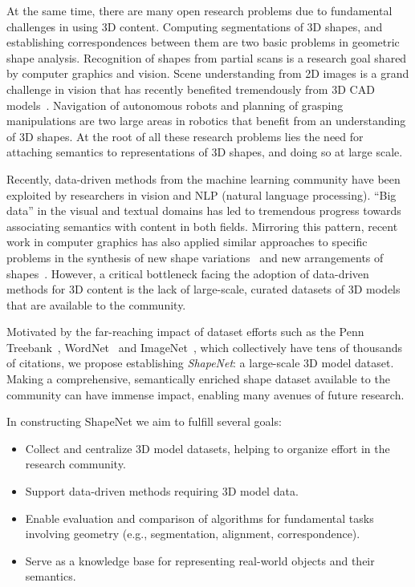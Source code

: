 At the same time, there are many open research problems due to fundamental challenges in using 3D content.  Computing segmentations of 3D shapes, and establishing correspondences between them are two basic problems in geometric shape analysis.  Recognition of shapes from partial scans is a research goal shared by computer graphics and vision.  Scene understanding from 2D images is a grand challenge in vision that has recently benefited tremendously from 3D CAD models~\cite{Song:2014:slidingwindow,wu:2014:3d}. Navigation of autonomous robots and planning of grasping manipulations are two large areas in robotics that benefit from an understanding of 3D shapes.  At the root of all these research problems lies the need for attaching semantics to representations of 3D shapes, and doing so at large scale.

Recently, data-driven methods from the machine learning community have been exploited by researchers in vision and NLP (natural language processing). ``Big data'' in the visual and textual domains has led to tremendous progress towards associating semantics with content in both fields.  Mirroring this pattern, recent work in computer graphics has also applied similar approaches to specific problems in the synthesis of new shape variations~\cite{kalogerakis:2012:probabilistic} and new arrangements of shapes~\cite{fisher:2012:example}.  However, a critical bottleneck facing the adoption of data-driven methods for 3D content is the lack of large-scale, curated datasets of 3D models that are available to the community.

Motivated by the far-reaching impact of dataset efforts such as the Penn Treebank~\cite{marcus:1993:penntreebank}, WordNet~\cite{miller:1995:wordnet} and ImageNet~\cite{deng:2009:imagenet}, which collectively have tens of thousands of citations, we propose establishing \emph{ShapeNet}: a large-scale 3D model dataset.  Making a comprehensive, semantically enriched shape dataset available to the community can have immense impact, enabling many avenues of future research.

In constructing ShapeNet we aim to fulfill several goals:
\begin{itemize}\denselist
 \item Collect and centralize 3D model datasets, helping to organize effort in the research community.
 \item Support data-driven methods requiring 3D model data.
 \item Enable evaluation and comparison of algorithms for fundamental tasks involving geometry (e.g., segmentation, alignment, correspondence).
 \item Serve as a knowledge base for representing real-world objects and their semantics.
\end{itemize}

